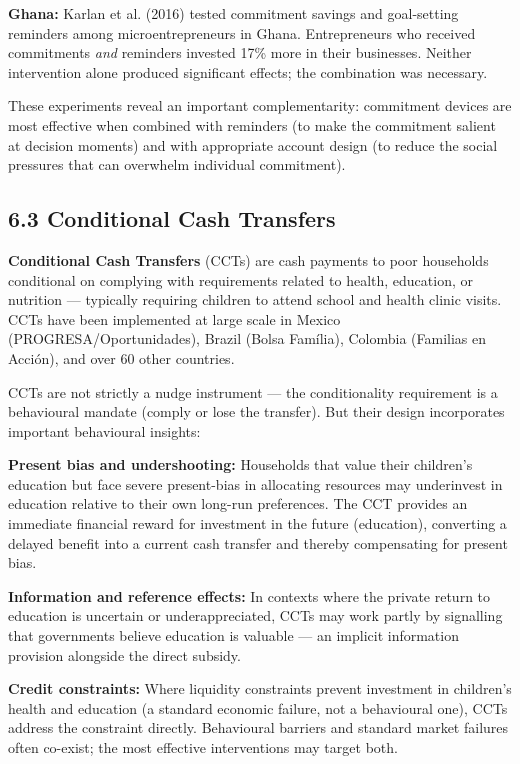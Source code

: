 \documentclass[12pt, letterpaper]{article}
\begin{document}
\textbf{Ghana:} Karlan et al. (2016) tested commitment savings and goal-setting reminders among microentrepreneurs in Ghana. Entrepreneurs who received commitments \textit{and} reminders invested 17\% more in their businesses. Neither intervention alone produced significant effects; the combination was necessary.

These experiments reveal an important complementarity: commitment devices are most effective when combined with reminders (to make the commitment salient at decision moments) and with appropriate account design (to reduce the social pressures that can overwhelm individual commitment).


\subsection{6.3 Conditional Cash Transfers}


\textbf{Conditional Cash Transfers} (CCTs) are cash payments to poor households conditional on complying with requirements related to health, education, or nutrition --- typically requiring children to attend school and health clinic visits. CCTs have been implemented at large scale in Mexico (PROGRESA/Oportunidades), Brazil (Bolsa Família), Colombia (Familias en Acción), and over 60 other countries.

CCTs are not strictly a nudge instrument --- the conditionality requirement is a behavioural mandate (comply or lose the transfer). But their design incorporates important behavioural insights:

\textbf{Present bias and undershooting:} Households that value their children's education but face severe present-bias in allocating resources may underinvest in education relative to their own long-run preferences. The CCT provides an immediate financial reward for investment in the future (education), converting a delayed benefit into a current cash transfer and thereby compensating for present bias.

\textbf{Information and reference effects:} In contexts where the private return to education is uncertain or underappreciated, CCTs may work partly by signalling that governments believe education is valuable --- an implicit information provision alongside the direct subsidy.

\textbf{Credit constraints:} Where liquidity constraints prevent investment in children's health and education (a standard economic failure, not a behavioural one), CCTs address the constraint directly. Behavioural barriers and standard market failures often co-exist; the most effective interventions may target both.
\end{document}
